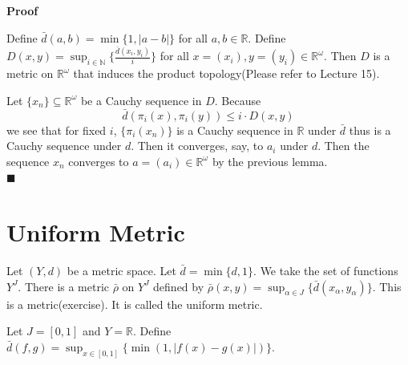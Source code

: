 \documentclass[main.tex]{subfiles}
\begin{document}
\par \noindent \textbf{Proof}
\par Define $\bar{d}(a, b) = \min\{1, |a - b| \}$ for all $a, b \in \mathbb{R}$. Define $D(x, y) = \sup_{i \in \mathbb{N}} \{\frac{\bar{d}(x_i, y_i)}{i}\}$ for all $x = (x_i), y = (y_i) \in \mathbb{R}^{\omega}$. Then $D$ is a metric on $\mathbb{R}^{\omega}$ that induces the product topology(Please refer to Lecture 15). 
\par Let $\{x_n\} \subseteq \mathbb{R}^{\omega}$ be a Cauchy sequence in $D$. Because 
\begin{equation}
    \bar{d}(\pi_i(x), \pi_i(y)) \leq i \cdot D(x, y)
\end{equation}
we see that for fixed $i$, $\{\pi_i(x_n)\}$ is a Cauchy sequence in $\mathbb{R}$ under $\bar{d}$ thus is a Cauchy sequence under $d$. Then it converges, say, to $a_i$ under $d$. Then the sequence $x_n$ converges to $a = (a_i) \in \mathbb{R}^{\omega}$ by the previous lemma.  
\mbox{} \\ \null \hfill $\blacksquare$ 

\section{Uniform Metric} 
Let $(Y, d)$ be a metric space. Let $\bar{d} = \min\{d, 1\}$. We take the set of functions $Y^J$. There is a metric $\bar{\rho}$ on $Y^J$ defined by $\bar{\rho}(x, y) = \sup_{\alpha \in J} \{\bar{d}(x_{\alpha}, y_{\alpha})\}$. This is a metric(exercise). It is called the uniform metric. 
\begin{example}
    Let $J = [0, 1]$ and $Y = \mathbb{R}$. 
    Define $\bar{d}(f, g) = \sup_{x \in [0,1]} \{\min(1, |f(x) - g(x)|)\}$.
\end{example}
\end{document}
